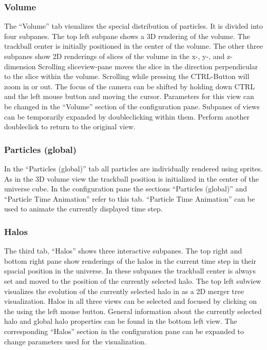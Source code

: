 \documentclass[
    fontsize=12pt,
    paper=a4,
    pagesize=auto,
    parskip=false,
    titlepage=on,
    english
]{scrartcl}
\begin{document}
\subsubsection{Volume}
The ``Volume'' tab visualizes the special distribution of particles.
It is divided into four subpanes.
The top left subpane shows a 3D rendering of the volume.
The trackball center is initially positioned in the center of the volume.
The other three subpanes show 2D renderings of slices of the volume in the x-, y-, and z-dimension
Scrolling sliceview-pane moves the slice in the direction perpendicular to the slice within the volume.
Scrolling while pressing the CTRL-Button will zoom in or out.
The focus of the camera can be shifted by holding down CTRL and the left mouse button and moving the cursor.
Parameters for this view can be changed in the ``Volume'' section of the configuration pane.
Subpanes of views can be temporarily expanded by doubleclicking within them.
Perform another doubleclick to return to the original view.

\subsubsection{Particles (global)}
In the ``Particles (global)'' tab all particles are individually rendered using sprites.
As in the 3D volume view the trackball position is initialized in the center of the universe cube.
In the configuration pane the sections ``Particles (global)'' and ``Particle Time Animation'' refer to this tab.
``Particle Time Animation'' can be used to animate the currently displayed time step.

\subsubsection{Halos}
The third tab, ``Halos'' shows three interactive subpanes.
The top right and bottom right pane show renderings of the halos in the current time step in their spacial position in the universe.
In these subpanes the trackball center is always set and moved to the position of the currently selected halo.
The top left subview visualizes the evolution of the currently selected halo in as a 2D merger tree visualization.
Halos in all three views can be selected and focused by clicking on the using the left mouse button.
General information about the currently selected halo and global halo properties can be found in the bottom left view.
The corresponding ``Halos'' section in the configuration pane can be expanded to change parameters used for the visualization.
\end{document}
